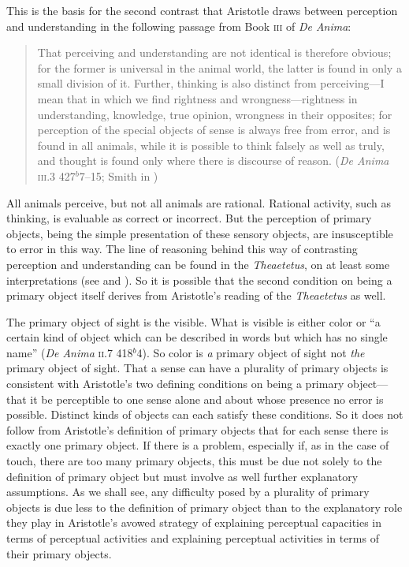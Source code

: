 This is the basis for the second contrast that Aristotle draws between perception and understanding in the following passage from Book \textsc{iii} of \emph{De Anima}:
\begin{quote}
	That perceiving and understanding are not identical is therefore obvious; for the former is universal in the animal world, the latter is found in only a small division of it. Further, thinking is also distinct from perceiving---I mean that in which we find rightness and wrongness---right\-ness in understanding, knowledge, true opinion, wrongness in their opposites; for perception of the special objects of sense is always free from error, and is found in all animals, while it is possible to think falsely as well as truly, and thought is found only where there is discourse of reason. (\emph{De Anima} \textsc{iii}.3 427\( ^{b} \)7--15; Smith in \citealt[49]{Barnes:1984uq})
\end{quote}
All animals perceive, but not all animals are rational. Rational activity, such as thinking, is evaluable as correct or incorrect. But the perception of primary objects, being the simple presentation of these sensory objects, are insusceptible to error in this way. The line of reasoning behind this way of contrasting perception and understanding can be found in the \emph{Theaetetus}, on at least some interpretations (see \citealt{Cooper:1970kx} and \citealt{Burnyeat:1990dp}). So it is possible that the second condition on being a primary object itself derives from Aristotle's reading of the \emph{Theaetetus} as well.

The primary object of sight is the visible. What is visible is either color or ``a certain kind of object which can be described in words but which has no single name'' (\emph{De Anima} \textsc{ii}.7 418\( ^{b} \)4). So color is \emph{a} primary object of sight not \emph{the} primary object of sight. That a sense can have a plurality of primary objects is consistent with Aristotle's two defining conditions on being a primary object---that it be perceptible to one sense alone and about whose presence no error is possible. Distinct kinds of objects can each satisfy these conditions. So it does not follow from Aristotle's definition of primary objects that for each sense there is exactly one primary object. If there is a problem, especially if, as in the case of touch, there are too many primary objects, this must be due not solely to the definition of primary object but must involve as well further explanatory assumptions. As we shall see, any difficulty posed by a plurality of primary objects is due less to the definition of primary object than to the explanatory role they play in Aristotle's avowed strategy of explaining perceptual capacities in terms of perceptual activities and explaining perceptual activities in terms of their primary objects.


